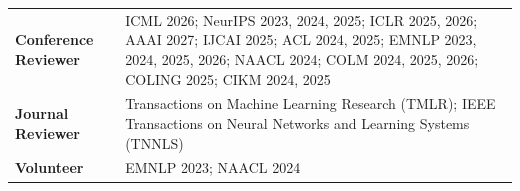 \begin{longtable}[l]{@{}>{\raggedright\arraybackslash}p{} >{\raggedright\arraybackslash}p{}@{}}
    \textbf{Conference Reviewer} & ICML 2026; NeurIPS 2023, 2024, 2025; ICLR 2025, 2026; AAAI 2027; IJCAI 2025; ACL 2024, 2025; EMNLP 2023, 2024, 2025, 2026; NAACL 2024; COLM 2024, 2025, 2026; COLING 2025; CIKM 2024, 2025 \\[0.4em]
    \textbf{Journal Reviewer} & Transactions on Machine Learning Research (TMLR); IEEE Transactions on Neural Networks and Learning Systems (TNNLS) \\[0.4em]
    \textbf{Volunteer} & EMNLP 2023; NAACL 2024
\end{longtable}
